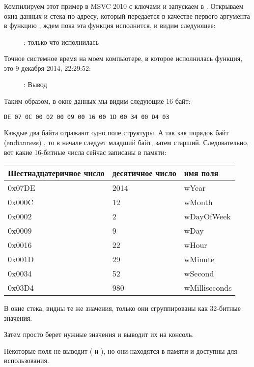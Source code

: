 ﻿\clearpage
\subsubsection{\olly}
\myindex{\olly}

Компилируем этот пример в MSVC 2010 с ключами  и запускаем в \olly.
Открываем окна данных и стека по адресу, который передается в качестве первого аргумента в функцию , 
ждем пока эта функция исполнится, и видим следующее:

\begin{figure}[H]
\centering
{}
\caption{\olly:  только что исполнилась}
\label{fig:struct_olly_1}
\end{figure}

Точное системное время на моем компьютере, в которое исполнилась функция, это 9 декабря 2014, 22:29:52:

\begin{figure}[H]
\centering
{}
\caption{\olly: Вывод \printf}
\label{fig:struct_olly_2}
\end{figure}

Таким образом, в окне данных мы видим следующие 16 байт: 
\begin{lstlisting}
DE 07 0C 00 02 00 09 00 16 00 1D 00 34 00 D4 03
\end{lstlisting}

Каждые два байта отражают одно поле структуры. 
А так как порядок байт (\gls{endianness}) ,
то в начале следует младший байт, затем старший.
Следовательно, вот какие 16-битные числа сейчас записаны в памяти:

\begin{center}
\begin{tabular}{ | l | l | l | }
\hline
\headercolor{} Шестнадцатеричное число & 
\headercolor{} десятичное число & 
\headercolor{} имя поля \\
\hline
0x07DE & 2014	& wYear \\
\hline
0x000C & 12	& wMonth \\
\hline
0x0002 & 2	& wDayOfWeek \\
\hline
0x0009 & 9	& wDay \\
\hline
0x0016 & 22	& wHour \\
\hline
0x001D & 29	& wMinute \\
\hline
0x0034 & 52	& wSecond \\
\hline	
0x03D4 & 980	& wMilliseconds \\
\hline
\end{tabular}
\end{center}

В окне стека, видны те же значения, только они сгруппированы как 32-битные значения.

Затем \printf просто берет нужные значения и выводит их на консоль.

Некоторые поля \printf не выводит ( и
), но они находятся в памяти и доступны для использования.

